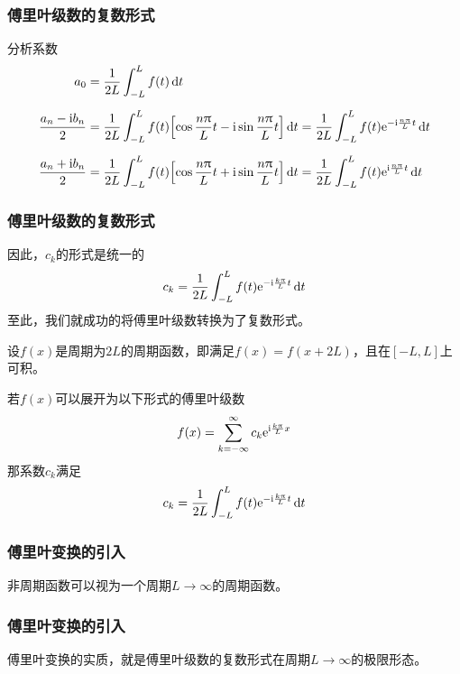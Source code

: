 \begin{frame}
    \frametitle{傅里叶级数的复数形式}
    分析系数
    \begin{align}
        a_0&=\frac{1}{2L}\Int[-L][L]{f(t)\dd{t}}\\[6pt]
        \frac{a_n-\i b_n}{2}
        &=\frac{1}{2L}
        \Int[-L][L]{f(t)\qty[\cos\frac{n\pi}{L}t-\i\sin\frac{n\pi}{L}t]\dd{t}}=
        \frac{1}{2L}
        \Int[-L][L]{f(t)\e^{-\i\frac{n\pi}{L}t}\dd{t}}\\[6pt]
        \frac{a_n+\i b_n}{2}
        &=\frac{1}{2L}
        \Int[-L][L]{f(t)\qty[\cos\frac{n\pi}{L}t+\i\sin\frac{n\pi}{L}t]\dd{t}}=
        \frac{1}{2L}
        \Int[-L][L]{f(t)\e^{\i\frac{n\pi}{L}t}\dd{t}}
    \end{align}
\end{frame}

\begin{frame}
    \frametitle{傅里叶级数的复数形式}
    因此，$c_k$的形式是统一的
    \begin{equation}
        c_k=\frac{1}{2L}
        \Int[-L][L]{f(t)\e^{-\i\frac{k\pi}{L}t}\dd{t}}
    \end{equation}
    至此，我们就成功的将傅里叶级数转换为了复数形式。
\end{frame}

\begin{frame}
    \begin{theorem}[傅里叶级数的复数形式]
        设$f(x)$是周期为$2L$的周期函数，即满足$f(x)=f(x+2L)$，且在$[-L,L]$上可积。

        若$f(x)$可以展开为以下形式的傅里叶级数
        \begin{equation}
            f(x)=\Sum[k=-\infty][\infty]{c_k\e^{\i\frac{k\pi}{L}x}}
        \end{equation}
        那系数$c_k$满足
        \begin{gather}
            c_k=\frac{1}{2L}
        \Int[-L][L]{f(t)\e^{-\i\frac{k\pi}{L}t}\dd{t}}
        \end{gather}
    \end{theorem}  
\end{frame}

\begin{frame}
    \frametitle{傅里叶变换的引入}
    \begin{center}
        非周期函数可以视为一个周期$L\to\infty$的周期函数。
    \end{center}
\end{frame}

\begin{frame}
    \frametitle{傅里叶变换的引入}
    \begin{center}
        傅里叶变换的实质，就是傅里叶级数的复数形式在周期$L\to\infty$的极限形态。
    \end{center}
\end{frame}

